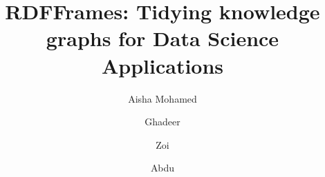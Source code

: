 \documentclass[sigconf, review, anonymous]{acmart}
\begin{document}
\title{RDFFrames: Tidying knowledge graphs for Data Science Applications}

\author{Aisha Mohamed}
\email{}
\orcid{}
\author{}
\affiliation{%
  \institution{}
  \streetaddress{}
  \city{}
  \state{}
  \postcode{}
}

\author{Ghadeer}
\email{}
\orcid{}
\author{}
\affiliation{%
  \institution{}
  \streetaddress{}
  \city{}
  \state{}
  \postcode{}
}

\author{Zoi}
\email{}
\orcid{}
\author{}
\affiliation{%
  \institution{}
  \streetaddress{}
  \city{}
  \state{}
  \postcode{}
}

\author{Abdu}
\email{}
\orcid{}
\author{}
\affiliation{%
  \institution{}
  \streetaddress{}
  \city{}
  \state{}
  \postcode{}
}


\renewcommand{\shortauthors}{}

\begin{abstract}
\end{abstract}


\keywords{}

\end{document}
